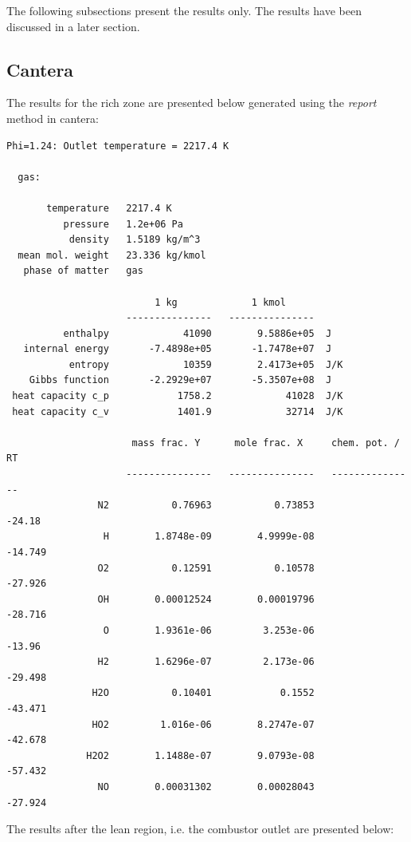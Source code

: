The following subsections present the results only. The results have been discussed in a later section.

\subsection{Cantera}

The results for the rich zone are presented below generated using the \textit{report} method in cantera:

\clearpage

\begin{verbatim}
Phi=1.24: Outlet temperature = 2217.4 K

  gas:

       temperature   2217.4 K
          pressure   1.2e+06 Pa
           density   1.5189 kg/m^3
  mean mol. weight   23.336 kg/kmol
   phase of matter   gas

                          1 kg             1 kmol     
                     ---------------   ---------------
          enthalpy             41090        9.5886e+05  J
   internal energy       -7.4898e+05       -1.7478e+07  J
           entropy             10359        2.4173e+05  J/K
    Gibbs function       -2.2929e+07       -5.3507e+08  J
 heat capacity c_p            1758.2             41028  J/K
 heat capacity c_v            1401.9             32714  J/K

                      mass frac. Y      mole frac. X     chem. pot. / RT
                     ---------------   ---------------   ---------------
                N2           0.76963           0.73853            -24.18
                 H        1.8748e-09        4.9999e-08           -14.749
                O2           0.12591           0.10578           -27.926
                OH        0.00012524        0.00019796           -28.716
                 O        1.9361e-06         3.253e-06            -13.96
                H2        1.6296e-07         2.173e-06           -29.498
               H2O           0.10401            0.1552           -43.471
               HO2         1.016e-06        8.2747e-07           -42.678
              H2O2        1.1488e-07        9.0793e-08           -57.432
                NO        0.00031302        0.00028043           -27.924
\end{verbatim}

The results after the lean region, i.e. the combustor outlet are presented below:

